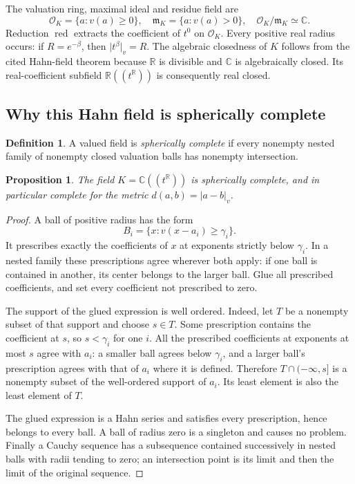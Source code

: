 \documentclass[11pt,a4paper]{article}
\numberwithin{equation}{section}
\newtheorem{proposition}[theorem]{Proposition}
\theoremstyle{definition}
\newtheorem{definition}[theorem]{Definition}
\theoremstyle{remark}
\newcommand{\C}{\mathbb C}
\newcommand{\R}{\mathbb R}
\newcommand{\OO}{\mathcal O}
\newcommand{\mm}{\mathfrak m}
\newcommand{\vabs}[1]{\lvert#1\rvert_v}
\newcommand{\red}{\operatorname{red}}
\begin{document}
The valuation ring, maximal ideal and residue field are
\[
 \OO_K=\{a:v(a)\ge0\},\quad
 \mm_K=\{a:v(a)>0\},\quad
 \OO_K/\mm_K\simeq\C.
\]
Reduction $\red$ extracts the coefficient of $t^0$ on $\OO_K$.
Every positive real radius occurs: if $R=e^{-\beta}$, then
$\vabs{t^\beta}=R$. The algebraic closedness of $K$ follows from the cited
Hahn-field theorem because $\R$ is divisible and $\C$ is algebraically closed.
Its real-coefficient subfield $\R((t^\R))$ is consequently real closed.

\subsection{Why this Hahn field is spherically complete}
\begin{definition}
A valued field is \emph{spherically complete} if every nonempty nested family
of nonempty closed valuation balls has nonempty intersection.
\end{definition}

\begin{proposition}\label{prop:spherical}
The field $K=\C((t^\R))$ is spherically complete, and in particular complete
for the metric $d(a,b)=\vabs{a-b}$.
\end{proposition}
\begin{proof}
A ball of positive radius has the form
\[
 B_i=\{x:v(x-a_i)\ge\gamma_i\}.
\]
It prescribes exactly the coefficients of $x$ at exponents strictly below
$\gamma_i$. In a nested family these prescriptions agree wherever both apply:
if one ball is contained in another, its center belongs to the larger ball.
Glue all prescribed coefficients, and set every coefficient not prescribed to
zero.

The support of the glued expression is well ordered. Indeed, let $T$ be a
nonempty subset of that support and choose $s\in T$. Some prescription contains
the coefficient at $s$, so $s<\gamma_i$ for one $i$. All the prescribed
coefficients at exponents at most $s$ agree with $a_i$: a smaller ball agrees
below $\gamma_i$, and a larger ball's prescription agrees with that of $a_i$
where it is defined. Therefore
$T\cap(-\infty,s]$ is a nonempty subset of the well-ordered support of $a_i$.
Its least element is also the least element of $T$.

The glued expression is a Hahn series and satisfies every prescription, hence
belongs to every ball. A ball of radius zero is a singleton and causes no
problem. Finally a Cauchy sequence has a subsequence contained successively in
nested balls with radii tending to zero; an intersection point is its limit and
then the limit of the original sequence.
\end{proof}
\end{document}
